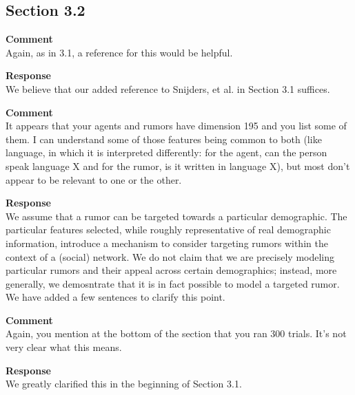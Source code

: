 \subsection{Section 3.2}
\setcounter{rev2-3.2}{1}

\textbf{Comment } \\
Again, as in 3.1, a reference for this would be helpful.

\textbf{Response } \\
We believe that our added reference to Snijders, et al. in Section 3.1 suffices.

\textbf{Comment } \\
It appears that your agents and rumors have dimension 195 and you list some of them.
I can understand some of those features being common to both (like language, in which it is interpreted differently: for the agent, can the person speak language X and for the rumor, is it written in language X), but most don't appear to be relevant to one or the other.

\textbf{Response } \\
We assume that a rumor can be targeted towards a particular demographic.
The particular features selected, while roughly representative of real demographic information, introduce a mechanism to consider targeting rumors within the context of a (social) network.
We do not claim that we are precisely modeling particular rumors and their appeal across certain demographics; instead, more generally, we demosntrate that it is in fact possible to model a targeted rumor.
We have added a few sentences to clarify this point.

\textbf{Comment } \\
Again, you mention at the bottom of the section that you ran 300 trials.
It's not very clear what this means.

\textbf{Response } \\
We greatly clarified this in the beginning of Section 3.1.
